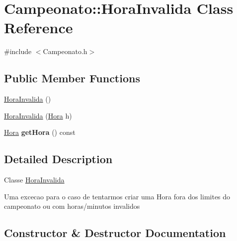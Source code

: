 \hypertarget{class_campeonato_1_1_hora_invalida}{}\section{Campeonato\+:\+:Hora\+Invalida Class Reference}
\label{class_campeonato_1_1_hora_invalida}


{\ttfamily \#include $<$Campeonato.\+h$>$}

\subsection*{Public Member Functions}
\begin{DoxyCompactItemize}
\item 
\hyperlink{class_campeonato_1_1_hora_invalida_a86c055a083548dcdd91200c129f4c455}{Hora\+Invalida} ()
\item 
\hyperlink{class_campeonato_1_1_hora_invalida_a8165c716bfae962843209e5cc9559f41}{Hora\+Invalida} (\hyperlink{class_hora}{Hora} h)
\item 
\hypertarget{class_campeonato_1_1_hora_invalida_ab47bee0b6238cdd0dc178b14a86374db}{}\hyperlink{class_hora}{Hora} {\bfseries get\+Hora} () const \label{class_campeonato_1_1_hora_invalida_ab47bee0b6238cdd0dc178b14a86374db}

\end{DoxyCompactItemize}


\subsection{Detailed Description}
Classe \hyperlink{class_campeonato_1_1_hora_invalida}{Hora\+Invalida} \begin{DoxyVerb}Uma excecao para o caso de tentarmos criar uma Hora fora dos limites do campeonato ou com horas/minutos invalidos\end{DoxyVerb}
 

\subsection{Constructor \& Destructor Documentation}
\hypertarget{class_campeonato_1_1_hora_invalida_a86c055a083548dcdd91200c129f4c455}{}
